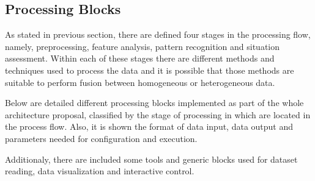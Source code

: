 

\subsection{Processing Blocks} \label{proc_blocks}

As stated in previous section, there are defined four stages in the processing flow, namely, preprocessing, feature analysis, pattern recognition and situation assessment. Within each of these stages there are different methods and techniques used to process the data and it is possible that those methods are suitable to perform fusion between homogeneous or heterogeneous data.

Below are detailed different processing blocks implemented as part of the whole architecture proposal, classified by the stage of processing in which are located in the process flow. Also, it is shown the format of data input, data output and parameters needed for configuration and execution.

Additionaly, there are included some tools and generic blocks used for dataset reading, data visualization and interactive control.

